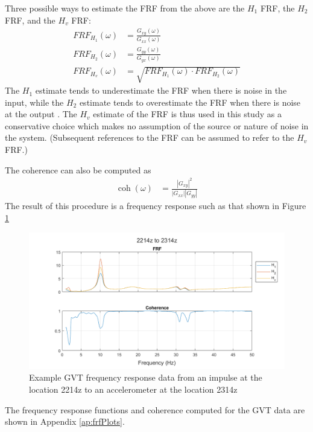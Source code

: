 Three possible ways to estimate the FRF from the above are the $H_1$ FRF, the $H_2$ FRF, and the $H_v$ FRF:
\begin{align}
    FRF_{H_1}(\omega) &= \frac{G_{xy}(\omega)}{G_{xx}(\omega)} \\
    FRF_{H_2}(\omega) &= \frac{G_{yy}(\omega)}{G_{yx}(\omega)} \\
    \label{eq:frf}
    FRF_{H_v}(\omega) &= \sqrt{FRF_{H_1}(\omega) \cdot FRF_{H_2}(\omega)}
\end{align}
The $H_1$ estimate tends to underestimate the FRF when there is noise in the input, while the $H_2$ estimate tends to overestimate the FRF when there is noise at the output \cite{Tischler2012}. The $H_v$ estimate of the FRF is thus used in this study as a conservative choice which makes no assumption of the source or nature of noise in the system. (Subsequent references to the FRF can be assumed to refer to the $H_v$ FRF.)

The coherence can also be computed as
\begin{align}
    \operatorname{coh}(\omega) &= \frac{|G_{xy}|^2}{|G_{xx}||G_{yy}|}
\end{align}
The result of this procedure is a frequency response such as that shown in Figure \ref{fig:gvtFreqExample}
\begin{figure}[H]
	\centering
	\includegraphics[width=6in]{figs/sampleGVT_FRF.png}
	\caption{Example GVT frequency response data from an impulse at the location 2214z to an accelerometer at the location 2314z}
	\label{fig:gvtFreqExample}
\end{figure}

The frequency response functions and coherence computed for the GVT data are shown in Appendix \ref{ap:frfPlots}.

